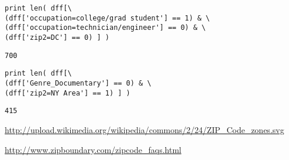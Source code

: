 \documentclass[12pt,fleqn]{article}\usepackage{../common}
\begin{document}
\begin{verbatim}
print len( dff[\
(dff['occupation=college/grad student'] == 1) & \
(dff['occupation=technician/engineer'] == 0) & \
(dff['zip2=DC'] == 0) ] )
\end{verbatim}

\begin{verbatim}
700
\end{verbatim}

\begin{verbatim}
print len( dff[\
(dff['Genre_Documentary'] == 0) & \
(dff['zip2=NY Area'] == 1) ] )
\end{verbatim}

\begin{verbatim}
415
\end{verbatim}


\url{http://upload.wikimedia.org/wikipedia/commons/2/24/ZIP_Code_zones.svg}

\url{http://www.zipboundary.com/zipcode_faqs.html}
\end{document}
